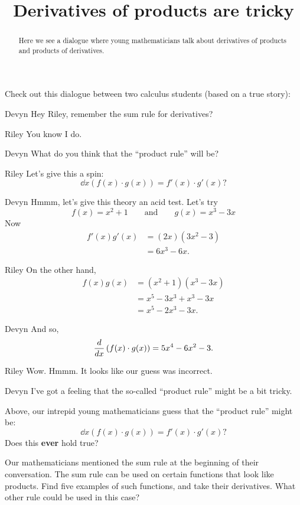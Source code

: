\documentclass{ximera}
\title[Break-Ground:]{Derivatives of products are tricky}
\begin{document}
\begin{abstract}
Here we see a dialogue where young mathematicians talk about
derivatives of products and products of derivatives.
\end{abstract}
\maketitle

Check out this dialogue between two calculus students (based on a true
story):

\begin{dialogue}
\item[Devyn] Hey Riley, remember the sum rule for derivatives?
\item[Riley] You know I do.
\item[Devyn] What do you think that the ``product rule'' will be?
\item[Riley] Let's give this a spin:
  \[
  \dd{x} \left(f(x)\cdot g(x)\right) = f'(x) \cdot g'(x)?
  \]
\item[Devyn] Hmmm, let's give this theory an acid test. Let's try
  \[
  f(x) = x^2+1\qquad\text{and}\qquad g(x) = x^3-3x
  \]
  Now
  \begin{align*}
    f'(x)g'(x) &= (2x)(3x^2-3)\\
    &= 6x^3-6x.
  \end{align*}
\item[Riley] On the other hand,
  \begin{align*}
    f(x)g(x) &= (x^2+1)(x^3-3x)\\
    &=x^5-3x^3+x^3-3x\\
    &=x^5-2x^3-3x.
  \end{align*} 
\item[Devyn] And so, 
  \[
  \frac{d}{dx} \left(f(x) \cdot g(x)\right) = 5x^4-6x^2-3.
  \]
\item[Riley] Wow. Hmmm. It looks like our guess was incorrect.
\item[Devyn] I've got a feeling that the so-called ``product rule''
  might be a bit tricky.
\end{dialogue}

\begin{problem}
  Above, our intrepid young mathematicians guess that the ``product rule'' might be:
  \[
  \dd{x} \left(f(x)\cdot g(x)\right) = f'(x) \cdot g'(x)?
  \]
  Does this \textbf{ever} hold true?
  \begin{freeResponse}
  \end{freeResponse}
\end{problem}

\begin{problem}
  Our mathematicians mentioned the sum rule at the beginning of their conversation.
  The sum rule can be used on certain functions that look like products.  Find five
  examples of such functions, and take their derivatives.  What other rule could be 
  used in this case?
  \begin{freeResponse}
  \end{freeResponse}
\end{problem}


\end{document}
